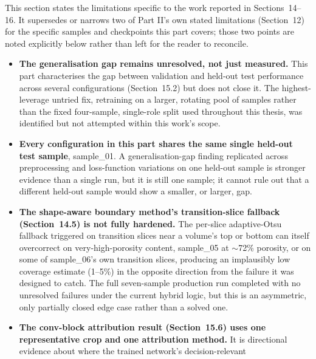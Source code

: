 
This section states the limitations specific to the work reported in Sections~14--16. It supersedes or
narrows two of Part II's own stated limitations (Section~12) for the specific samples and checkpoints
this part covers; those two points are noted explicitly below rather than left for the reader to
reconcile.

\begin{itemize}
\item \textbf{The generalisation gap remains unresolved, not just measured.} This part characterises
  the gap between validation and held-out test performance across several configurations
  (Section~15.2) but does not close it. The highest-leverage untried fix, retraining on a larger,
  rotating pool of samples rather than the fixed four-sample, single-role split used throughout this
  thesis, was identified but not attempted within this work's scope.
\item \textbf{Every configuration in this part shares the same single held-out test sample},
  sample\_01. A generalisation-gap finding replicated across preprocessing and loss-function
  variations on one held-out sample is stronger evidence than a single run, but it is still one sample;
  it cannot rule out that a different held-out sample would show a smaller, or larger, gap.
\item \textbf{The shape-aware boundary method's transition-slice fallback (Section~14.5) is not fully
  hardened.} The per-slice adaptive-Otsu fallback triggered on transition slices near a volume's top or
  bottom can itself overcorrect on very-high-porosity content, sample\_05 at $\sim$72\% porosity, or on
  some of sample\_06's own transition slices, producing an implausibly low coverage estimate (1--5\%)
  in the opposite direction from the failure it was designed to catch. The full seven-sample production
  run completed with no unresolved failures under the current hybrid logic, but this is an
  asymmetric, only partially closed edge case rather than a solved one.
\item \textbf{The conv-block attribution result (Section~15.6) uses one representative crop and one
  attribution method.} It is directional evidence about where the trained network's decision-relevant

\end{itemize}
